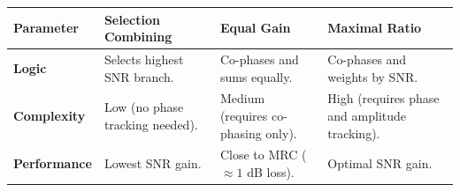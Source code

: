 \documentclass[12pt,a4paper]{article}
\renewcommand{\arraystretch}{1.45}
\begin{document}
\begin{tcolorbox}[tikzbox, title={Comparison of Diversity Combining Methods}]
\renewcommand{\arraystretch}{1.4}
\par\noindent
{\renewcommand{\arraystretch}{1.55}%
\begin{tabularx}{\linewidth}{|B{3.0cm}|Y|Y|Y|}\hline
\textbf{Parameter} & \textbf{Selection Combining} & \textbf{Equal Gain} & \textbf{Maximal Ratio} \\
\hline
\textbf{Logic} & Selects highest SNR branch. & Co-phases and sums equally. & Co-phases and weights by SNR. \\[4pt]
\hline
\textbf{Complexity} & Low (no phase tracking needed). & Medium (requires co-phasing only). & High (requires phase and amplitude tracking). \\[4pt]
\hline
\textbf{Performance} & Lowest SNR gain. & Close to MRC ($\approx 1$ dB loss). & Optimal SNR gain. \\
\hline
\end{tabularx}
}
\end{tcolorbox}
\end{document}
